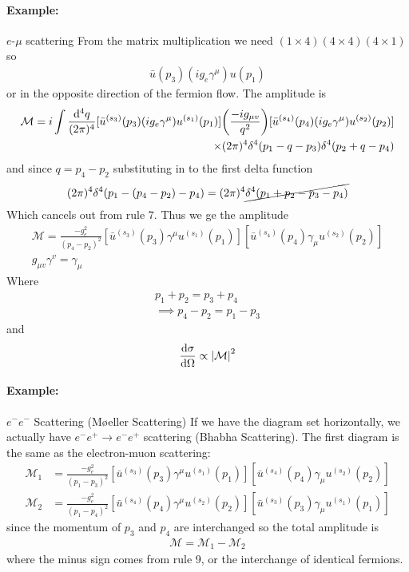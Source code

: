 \documentclass[../main.tex]{subfiles}
\begin{document}
\paragraph*{Example:} $e$-$\mu$ scattering
From the matrix multiplication we need $(1 \times 4) (4 \times 4) (4 \times 1)$ so
\begin{align*}
    \bar u(p_3) (ig_e \gamma^\mu) u(p_1)
\end{align*}
or in the opposite direction of the fermion flow. The amplitude is
\begin{align*}
    \mathcal{M} = i \int \frac{\dd[4]{q}}{(2\pi)^4} [\bar u^{(s_3)}(p_3) (ig_e \gamma^\mu) u^{(s_1)}(p_1)] 
    \qt(\frac{-ig_{\mu v}}{q^2}) [\bar u^{(s_4)}(p_4) (ig_e \gamma^\mu) u^{(s_2)}(p_2)] \\
    \times (2\pi)^4 \delta^4(p_1 - q - p_3) \delta^4(p_2 + q - p_4)
\end{align*}
and since $q = p_4 - p_2$ substituting in to the first delta function
\begin{align*}
    (2\pi)^4 \delta^4(p_1 - (p_4 - p_2) - p_4) = (2\pi)^4 \cancel{\delta^4(p_1 + p_2 - p_3 - p_4)}
\end{align*}
Which cancels out from rule 7. Thus we ge the amplitude
\begin{align*}
    \mathcal{M} = \frac{-g_e^2}{(p_4 - p_2)^2} [\bar u^{(s_3)}(p_3) \gamma^\mu u^{(s_1)}(p_1)]
     [\bar u^{(s_4)}(p_4) \gamma_\mu u^{(s_2)}(p_2)] \\
    g_{\mu v} \gamma^v = \gamma_\mu 
\end{align*}
Where
\begin{align*}
    p_1 + p_2 = p_3 + p_4 \\
    \implies p_4 - p_2 = p_1 - p_3
\end{align*}
and 
\begin{align*}
    \dv{\sigma}{\Omega} \propto \abs{\mathcal{M}}^2
\end{align*}

\paragraph*{Example:} $e^- e^-$ Scattering (M{\o}eller Scattering)
If we have the diagram set horizontally, we actually have $e^- e^+ \to e^- e^+$ scattering 
(Bhabha Scattering). The first diagram is the same as the electron-muon scattering:
\begin{align*}
    \mathcal{M}_1 &= \frac{-g_e^2}{(p_1 - p_3)^2} [\bar u^{(s_3)}(p_3) \gamma^\mu u^{(s_1)}(p_1)]
     [\bar u^{(s_4)}(p_4) \gamma_\mu u^{(s_2)}(p_2)] \\
    \mathcal{M}_2 &= \frac{-g_e^2}{(p_1 - p_4)^2} [\bar u^{(s_4)}(p_4) \gamma^\mu u^{(s_2)}(p_2)]
     [\bar u^{(s_3)}(p_3) \gamma_\mu u^{(s_1)}(p_1)]
\end{align*}
since the momentum of $p_3$ and $p_4$ are interchanged so the total amplitude is
\begin{align*}
    \mathcal{M} = \mathcal{M}_1 - \mathcal{M}_2
\end{align*}
where the minus sign comes from rule 9, or the interchange of identical fermions.
\end{document}
